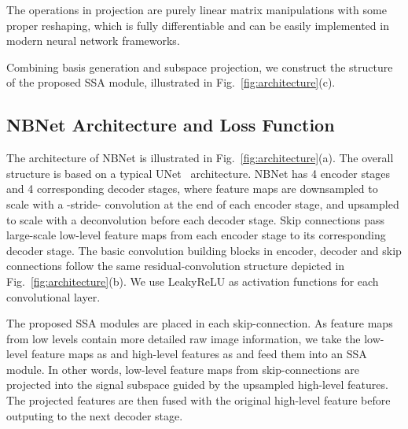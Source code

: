 \documentclass[final]{cvpr}
\newcommand{\remove}[1]{}
\begin{document}
The operations in projection are purely linear matrix manipulations with some proper reshaping, which
is fully differentiable and can be easily implemented in modern neural network frameworks.

Combining basis generation and subspace projection, we construct the structure of the proposed SSA module, illustrated in Fig.~\ref{fig:architecture}(c).

\remove{
The transformation step  works as change of basis. In general, the transformed feature map can be represented in the following form:

Here, we take the orthogonal projection as . Note that the column vectors of  are all zero except , the component of  on the  vectors does not have any subsequent effect on the network, so we can use  as the projection matrix. From the point of view of subspace, the projection component can be viewed as a coefficient of subspace:

where  is the coefficient matrix.

Now, we need to use the subspace to reconstruct the features without the noise:

where  has the same size with . In practice, the output of the kernel function  is . This reduces the amount of memory and computation when the input is large. 
}

\subsection{NBNet Architecture and Loss Function}

The architecture of NBNet is illustrated in Fig.~\ref{fig:architecture}(a). The overall structure
is based on a typical UNet~\cite{ronneberger2015u} architecture. NBNet has 4 encoder stages and 4 corresponding decoder stages, where feature maps
are downsampled to  scale with a -stride- convolution at the end of each encoder stage, and upsampled to  scale with a  deconvolution before each decoder stage. Skip connections pass large-scale low-level feature maps from each encoder stage to
its corresponding decoder stage. The basic convolution building blocks in encoder, decoder and skip connections follow the same residual-convolution structure depicted in Fig.~\ref{fig:architecture}(b).
We use LeakyReLU as activation functions for each convolutional layer.

The proposed SSA modules are placed in each skip-connection. As feature maps from low levels contain
more detailed raw image information, we take the low-level feature maps as  and high-level 
features as  and feed them into an SSA module. In other words, low-level feature maps from
skip-connections are projected into the signal subspace guided by the upsampled high-level features. The projected features are then fused with the original high-level feature before outputing to the next decoder stage.
\end{document}
